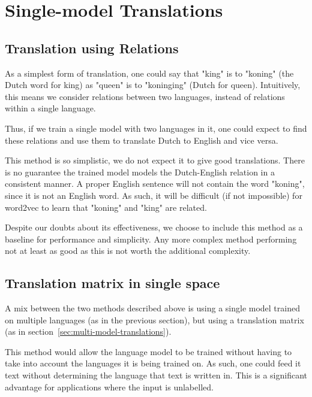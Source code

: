 \section{Single-model Translations}
\label{sec:single-model-translations}

\subsection{Translation using Relations}
\label{sec:single-model-no-matrix}
As a simplest form of translation, one could say that "king" is to "koning" (the Dutch word for king) as "queen" is to "koninging" (Dutch for queen). Intuitively, this means we consider relations between two languages, instead of relations within a single language.

Thus, if we train a single model with two languages in it, one could expect to find these relations and use them to translate Dutch to English and vice versa.

This method is so simplistic, we do not expect it to give good translations. There is no guarantee the trained model models the Dutch-English relation in a consistent manner. A proper English sentence will not contain the word "koning", since it is not an English word. As such, it will be difficult (if not impossible) for word2vec to learn that "koning" and "king" are related.

Despite our doubts about its effectiveness, we choose to include this method as a baseline for performance and simplicity. Any more complex method performing not at least as good as this is not worth the additional complexity.

\subsection{Translation matrix in single space}
\label{sec:single-model-with-matrix}
A mix between the two methods described above is using a single model trained on multiple languages (as in the previous section), but using a translation matrix (as in section~\ref{sec:multi-model-translations}).

This method would allow the language model to be trained without having to take into account the languages it is being trained on. As such, one could feed it text without determining the language that text is written in. This is a significant advantage for applications where the input is unlabelled.

